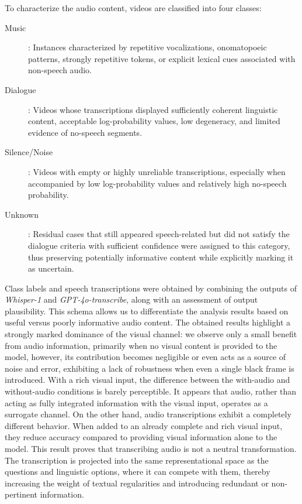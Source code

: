 To characterize the audio content, videos are classified into four classes:
\begin{description}
\item[Music]: Instances characterized by repetitive vocalizations, onomatopoeic patterns, strongly repetitive tokens, or explicit lexical cues associated with non-speech audio.
\item[Dialogue]: Videos whose transcriptions displayed sufficiently coherent linguistic content, acceptable log-probability values, low degeneracy, and limited evidence of no-speech segments.
\item[Silence/Noise]: Videos with empty or highly unreliable transcriptions, especially when accompanied by low log-probability values and relatively high no-speech probability.
\item[Unknown]: Residual cases that still appeared speech-related but did not satisfy the dialogue criteria with sufficient confidence were assigned to this category, thus preserving potentially informative content while explicitly marking it as uncertain.
\end{description}
Class labels and speech transcriptions were obtained by combining the outputs of \textit{Whisper-1} and \textit{\acs{GPT}-4o-transcribe}, along with an assessment of output plausibility. This schema allows us to differentiate the analysis results based on useful versus poorly informative audio content.
The obtained results highlight a strongly marked dominance of the visual channel: we observe only a small benefit from audio information, primarily when no visual content is provided to the model, however, its contribution becomes negligible or even acts as a source of noise and error, exhibiting a lack of robustness when even a single black frame is introduced.
With a rich visual input, the difference between the with-audio and without-audio conditions is barely perceptible. It appears that audio, rather than acting as fully integrated information with the visual input, operates as a surrogate channel.
On the other hand, audio transcriptions exhibit a completely different behavior. When added to an already complete and rich visual input, they reduce accuracy compared to providing visual information alone to the model. This result proves that transcribing audio is not a neutral transformation. The transcription is projected into the same representational space as the questions and linguistic options, where it can compete with them, thereby increasing the weight of textual regularities and introducing redundant or non-pertinent information.
